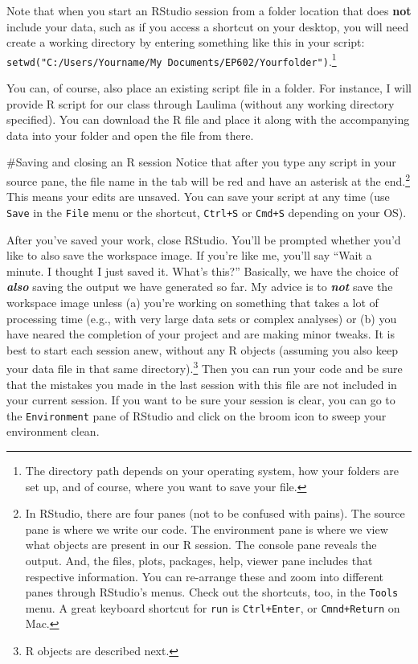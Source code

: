 \documentclass[]{tufte-handout}
\begin{document}
Note that when you start an RStudio session from a folder location that
does \textbf{not} include your data, such as if you access a shortcut on
your desktop, you will need create a working directory by entering
something like this in your script:
\texttt{setwd("C:/Users/Yourname/My\ Documents/EP602/Yourfolder")}.\footnote{The
  directory path depends on your operating system, how your folders are
  set up, and of course, where you want to save your file.}

You can, of course, also place an existing script file in a folder. For
instance, I will provide R script for our class through Laulima (without
any working directory specified). You can download the R file and place
it along with the accompanying data into your folder and open the file
from there.

\#Saving and closing an R session Notice that after you type any script
in your source pane, the file name in the tab will be red and have an
asterisk at the end.\footnote{In RStudio, there are four panes (not to
  be confused with pains). The source pane is where we write our code.
  The environment pane is where we view what objects are present in our
  R session. The console pane reveals the output. And, the files, plots,
  packages, help, viewer pane includes that respective information. You
  can re-arrange these and zoom into different panes through RStudio's
  menus. Check out the shortcuts, too, in the \texttt{Tools} menu. A
  great keyboard shortcut for \texttt{run} is \texttt{Ctrl+Enter}, or
  \texttt{Cmnd+Return} on Mac.} This means your edits are unsaved. You
can save your script at any time (use \texttt{Save} in the \texttt{File}
menu or the shortcut, \texttt{Ctrl+S} or \texttt{Cmd+S} depending on
your OS).

After you've saved your work, close RStudio. You'll be prompted whether
you'd like to also save the workspace image. If you're like me, you'll
say ``Wait a minute. I thought I just saved it. What's this?''
Basically, we have the choice of \textbf{\emph{also}} saving the output
we have generated so far. My advice is to \textbf{\emph{not}} save the
workspace image unless (a) you're working on something that takes a lot
of processing time (e.g., with very large data sets or complex analyses)
or (b) you have neared the completion of your project and are making
minor tweaks. It is best to start each session anew, without any R
objects (assuming you also keep your data file in that same
directory).\footnote{R objects are described next.} Then you can run
your code and be sure that the mistakes you made in the last session
with this file are not included in your current session. If you want to
be sure your session is clear, you can go to the \texttt{Environment}
pane of RStudio and click on the broom icon to sweep your environment
clean.
\end{document}

